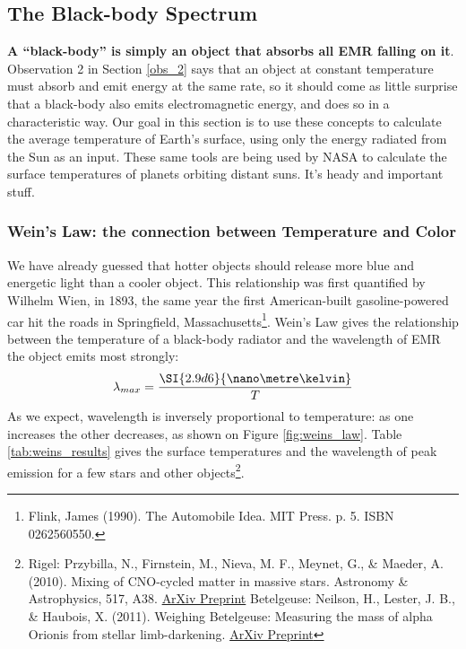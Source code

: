 \subsection{The Black-body Spectrum}
\textbf{A ``black-body'' is simply an object that absorbs all EMR falling on it}. Observation 2 in Section \ref{obs_2} says that an object at constant temperature must absorb and emit energy at the same rate, so it should come as little surprise that a black-body also emits electromagnetic energy, and does so in a characteristic way. Our goal in this section is to use these concepts to calculate the average temperature of Earth's surface, using only the energy radiated from the Sun as an input. These same tools are being used by NASA to calculate the surface temperatures of planets orbiting distant suns. It's heady and important stuff.

\subsubsection{Wein's Law: the connection between Temperature and Color}
We have already guessed that hotter objects should release more blue and energetic light than a cooler object. This relationship was first quantified by Wilhelm Wien, in 1893, the same year the first American-built gasoline-powered car hit the roads in Springfield, Massachusetts\footnote{Flink, James (1990). The Automobile Idea. MIT Press. p. 5. ISBN 0262560550.}. Wein's Law gives the relationship between the temperature of a black-body radiator and the wavelength of EMR the object emits most strongly:
\begin{equation}
	\lambda_{max}=\frac{\SI{2.9d6}{\nano\metre\kelvin}}{T}
\end{equation}
As we expect, wavelength is inversely proportional to temperature: as one increases the other decreases, as shown on Figure \ref{fig:weins_law}. Table \ref{tab:weins_results} gives the surface temperatures and the wavelength of peak emission for a few stars and other objects\footnote{Rigel: Przybilla, N., Firnstein, M., Nieva, M. F., Meynet, G., \& Maeder, A. (2010). Mixing of CNO-cycled matter in massive stars. Astronomy \& Astrophysics, 517, A38. \href{https://arxiv.org/abs/1005.2278}{ArXiv Preprint} Betelgeuse: Neilson, H., Lester, J. B., \& Haubois, X. (2011). Weighing Betelgeuse: Measuring the mass of alpha Orionis from stellar limb-darkening. \href{https://arxiv.org/abs/1109.4562}{ArXiv Preprint}}.

